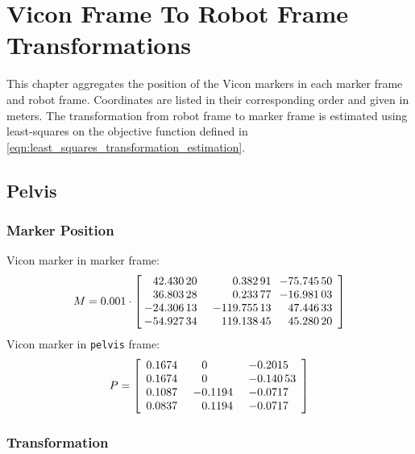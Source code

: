\chapter{Vicon Frame To Robot Frame Transformations}

This chapter aggregates the position of the Vicon markers in each marker frame and robot frame. Coordinates are listed in their corresponding order and given in meters. The transformation from robot frame to marker frame is estimated using least-squares on the objective function defined in \cref{eqn:least_squares_transformation_estimation}.

\section{Pelvis}

\subsection{Marker Position}

Vicon marker in marker frame:
\begin{equation}
M = 0.001 \cdot \begin{bmatrix}
\begin{array}{S[table-format=3.5]S[table-format=5.5]S[table-format=3.5]}
42.43020 & 0.38291 & -75.74550 \\
36.80328 & 0.23377 & -16.98103 \\
-24.30613 & -119.75513 & 47.44633 \\
-54.92734 & 119.13845 & 45.28020
\end{array}
\end{bmatrix}
\end{equation}
%
Vicon marker in \texttt{pelvis} frame:
\begin{equation}
P = \begin{bmatrix}
\begin{array}{S[table-format=1.5]S[table-format=2.5]S[table-format=2.5]}
0.1674 & 0 & -0.2015 \\
0.1674 & 0 & -0.14053 \\
0.1087 & -0.1194 & -0.0717 \\
0.0837 & 0.1194 & -0.0717
\end{array}
\end{bmatrix}
\end{equation}


\subsection{Transformation}

